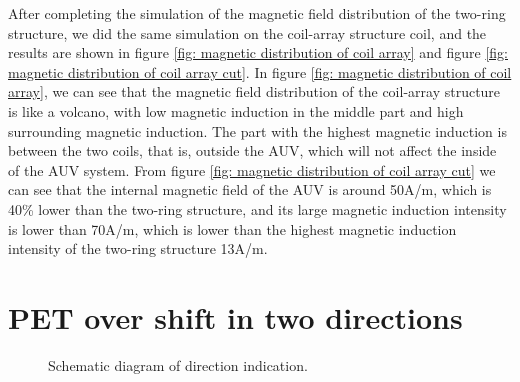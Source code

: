 After completing the simulation of the magnetic field distribution of the two-ring structure, we did the same simulation on the coil-array structure coil, and the results are shown in figure \ref{fig: magnetic distribution of coil array} and figure \ref{fig: magnetic distribution of coil array cut}.
In figure \ref{fig: magnetic distribution of coil array}, we can see that the magnetic field distribution of the coil-array structure is like a volcano, with low magnetic induction in the middle part and high surrounding magnetic induction. The part with the highest magnetic induction is between the two coils, that is, outside the AUV, which will not affect the inside of the AUV system. From figure \ref{fig: magnetic distribution of coil array cut} we can see that the internal magnetic field of the AUV is around 50A/m, which is 40\% lower than the two-ring structure, and its large magnetic induction intensity is lower than 70A/m, which is lower than the highest magnetic induction intensity of the two-ring structure 13A/m.


\section{PET over shift in two directions}

\begin{figure}[!t]
    \centering
    \caption{Schematic diagram of direction indication.}
    \label{fig: direction}
\end{figure}

